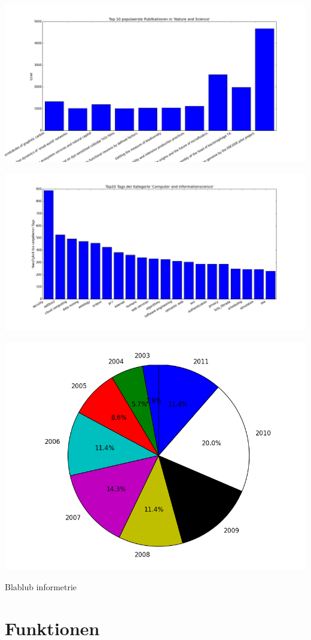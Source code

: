 \documentclass[letterpaper,10pt,english]{sphinxmanual}
\begin{document}
\includegraphics{top10_NS.png}

\includegraphics{Top20Tags.png}

\includegraphics{Verteilung_overall.png}

Blablub informetrie


\section{Funktionen}
\label{project_3:funktionen}
\end{document}
